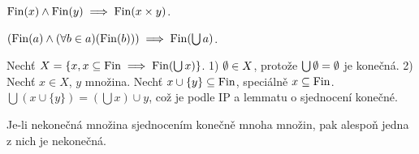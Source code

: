 \documentclass[12pt]{article}                   %
\begin{document}
    \begin{dusledek}
        $\operatorname{Fin}(x) \land \operatorname{Fin}(y) \implies \operatorname{Fin}(x \times y)$.
    \end{dusledek}

    \begin{lemma}
        $(\operatorname{Fin}(a) \land (\forall b \in a)(\operatorname{Fin}(b))) \implies \operatorname{Fin}(\bigcup a)$.

        \begin{dukazin}[Indukcí]
            Nechť $X = \{x, x \subseteq \operatorname{Fin} \implies \operatorname{Fin}(\bigcup x)\}$. 1) $\emptyset \in X$, protože $\bigcup \emptyset = \emptyset$ je konečná. 2) Nechť $x \in X$, $y$ množina. Nechť $x \cup \{y\} \subseteq \operatorname{Fin}$, speciálně $x \subseteq \operatorname{Fin}$. $\bigcup (x \cup \{y\}) = (\bigcup x)\cup y$, což je podle IP a lemmatu o sjednocení konečné.
        \end{dukazin}
    \end{lemma}

    \begin{dusledek}
        Je-li nekonečná množina sjednocením konečně mnoha množin, pak alespoň jedna z nich je nekonečná.
    \end{dusledek}
\end{document}

